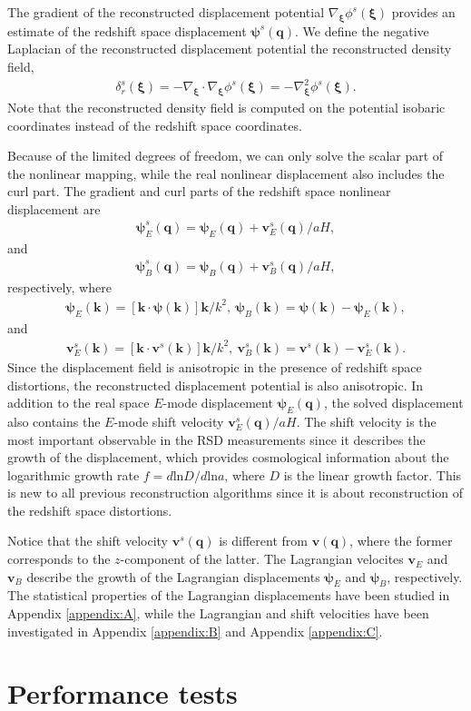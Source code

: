 \documentclass[aps,prx,twocolumn,superscriptaddress,groupedaddress,nofootinbib,amsfont]{revtex4}  %
\newcommand{\mr}{\mathrm}
\newcommand{\bea}{\begin{eqnarray}}
\newcommand{\eea}{\end{eqnarray}}
\newcommand{\bmp}{\bm{\psi}}
\newcommand{\bmv}{\bm{v}}
\newcommand{\bmk}{\bm{k}}
\newcommand{\bmq}{\bm{q}}
\newcommand{\bmxi}{\bm{\xi}}
\begin{document}
The gradient of the reconstructed  displacement potential $\nabla_{\bmxi}\phi^s(\bmxi)$ provides an estimate of the redshift space displacement $\bmp^s(\bmq)$.
We define the negative Laplacian of the reconstructed displacement potential 
the reconstructed density field,
\bea
\label{eq:density}
\delta_r^s(\bmxi)=-\nabla_{\bmxi}\cdot\nabla_{\bmxi}\phi^s(\bmxi)=-\nabla^2_{\bmxi}\phi^s(\bmxi).
\eea
Note that the reconstructed density field is computed on the potential isobaric
coordinates instead of the redshift space coordinates.

Because of the limited degrees of freedom, we can only solve the scalar part 
of the nonlinear mapping, while the real nonlinear displacement also includes 
the curl part. 
The gradient and curl parts of the redshift space nonlinear displacement are
\bea
\bmp^s_E(\bmq)=\bmp_E(\bmq)+{\bmv^s_E(\bmq)}/{aH},
\eea
and
\bea
\bmp^s_B(\bmq)=\bmp_B(\bmq)+{\bmv^s_B(\bmq)}/{aH},
\eea
respectively, where 
\bea
\bmp_E(\bmk)=[\bmk\cdot\bmp(\bmk)]\bmk/k^2,\ \bmp_B(\bmk)=\bmp(\bmk)-\bmp_E(\bmk),
\eea
and 
\bea
\bmv^s_E(\bmk)=[\bmk\cdot\bmv^s(\bmk)]\bmk/k^2,\ \bmv_B^s(\bmk)=\bmv^s(\bmk)-\bmv^s_E(\bmk).
\eea
Since the displacement field is anisotropic in the presence of redshift space
distortions, the reconstructed displacement potential is also anisotropic.
In addition to the real space $E$-mode displacement $\bmp_E(\bmq)$, the solved
displacement also contains the $E$-mode shift velocity $\bmv_E^s(\bmq)/aH$.
The shift velocity is the most important observable in the RSD measurements 
since it describes the growth of the displacement, which provides cosmological 
information about the logarithmic growth rate $f=d\mr{ln}D/d\mr{ln}a$, where
$D$ is the linear growth factor.
This is new to all previous reconstruction algorithms since it is about  
reconstruction of the redshift space distortions.

Notice that the shift velocity $\bmv^s(\bmq)$ is different from $\bmv(\bmq)$, 
where the former corresponds to the $z$-component of the latter.
The Lagrangian velocites $\bmv_{E}$ and $\bmv_{B}$ describe the growth of the 
Lagrangian displacements $\bmp_{E}$ and $\bmp_{B}$, respectively. 
The statistical properties of the Lagrangian displacements have been studied in
Appendix \ref{appendix:A}, while the Lagrangian and shift velocities have been
investigated in Appendix \ref{appendix:B} and Appendix \ref{appendix:C}.


\section{Performance tests}
\label{sec:prf}
\end{document}
